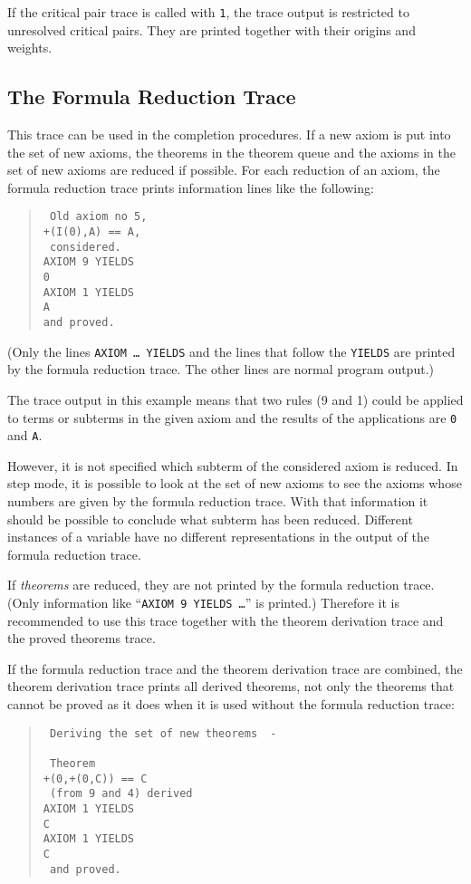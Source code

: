 If the critical pair trace is called with {\tt 1}, the trace output is
restricted to unresolved critical pairs. They are printed together with
their origins and weights.

\subsection{The Formula Reduction Trace}
This trace can be used in the completion procedures.
If a new axiom is put into the set of new axioms, the theorems in the
theorem queue and the axioms in the set of new axioms are reduced if
possible. For each reduction of an axiom, the formula reduction trace 
prints information lines like the following:
\begin{quote}
\begin{verbatim}
 Old axiom no 5,            
+(I(0),A) == A,
 considered.
AXIOM 9 YIELDS
0
AXIOM 1 YIELDS
A
and proved.
\end{verbatim}
\end{quote}
(Only the lines {\tt AXIOM \ldots\ YIELDS} and the lines that follow the
{\tt YIELDS} are printed by the formula reduction trace. The other
lines are normal program output.)

The trace output in this example means that two rules (9 and 1) could be
applied to terms or subterms in the given axiom and the results of the
applications are {\tt 0} and {\tt A}.

However, it is not specified which subterm of the considered axiom is
reduced. In step mode, it is possible to look at the set of new axioms to
see the axioms whose numbers are given by the formula reduction trace.
With that information it should be possible to conclude what subterm has
been reduced. Different instances of a variable have no different
representations in the output of the formula reduction trace.

If {\em theorems} are reduced, they are not printed
by the formula reduction trace. (Only information like ``{\tt AXIOM 9
YIELDS \ldots}'' is printed.) 
Therefore it is recommended to use this 
trace together with the theorem derivation trace and the proved
theorems trace.

If the formula reduction trace and the theorem derivation trace are
combined, the theorem derivation trace prints all derived theorems, 
not only the theorems that cannot be proved as it does when it is used
without the formula reduction trace:
\begin{quote}
\begin{verbatim}
 Deriving the set of new theorems  -

 Theorem
+(0,+(0,C)) == C
 (from 9 and 4) derived
AXIOM 1 YIELDS
C
AXIOM 1 YIELDS
C
 and proved.
\end{verbatim}
\end{quote}

